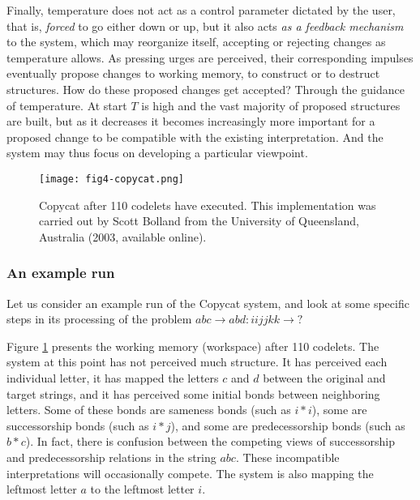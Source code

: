 \begin{enumerate}
Finally, temperature does not act as a control parameter dictated by the user, that is, \emph{forced} to go either down or up, but it also acts \emph{as a feedback mechanism} to the system, which may reorganize itself, accepting or rejecting changes as temperature allows.  As pressing urges are perceived, their corresponding impulses eventually propose changes to working memory, to construct or to destruct structures.  How do these proposed changes get accepted?  Through the guidance of temperature.  At start $T$ is high and the vast majority of proposed structures are built, but as it decreases it becomes increasingly more important for a proposed change to be compatible with the existing interpretation.  And the system may thus focus on developing a particular viewpoint.

\end{enumerate}

\begin{figure}
\centering
\texttt{[image: fig4-copycat.png]}
\caption{\label{fig:run-1}Copycat after 110 codelets have executed.  This implementation was carried out by Scott Bolland from the University of Queensland, Australia (2003, available online).}
\end{figure}

\subsubsection{An example run}

Let us consider an example run of the Copycat system, and look at some specific steps in its processing of the problem $abc\to abd : iijjkk \to ?$  




Figure \ref{fig:run-1} presents the working memory (workspace) after 110 codelets.  The system at this point has not perceived much structure.  It has perceived each individual letter, it has mapped the letters $c$ and $d$ between the original and target strings, and it has perceived some initial bonds between neighboring letters.  Some of these bonds are sameness bonds (such as $i*i$), some are successorship bonds (such as $i*j$), and some are predecessorship bonds (such as $b*c$).  In fact, there is confusion between the competing views of successorship and predecessorship relations in the string $abc$.  These incompatible interpretations will occasionally compete.  The system is also mapping the leftmost letter $a$ to the leftmost letter $i$.




